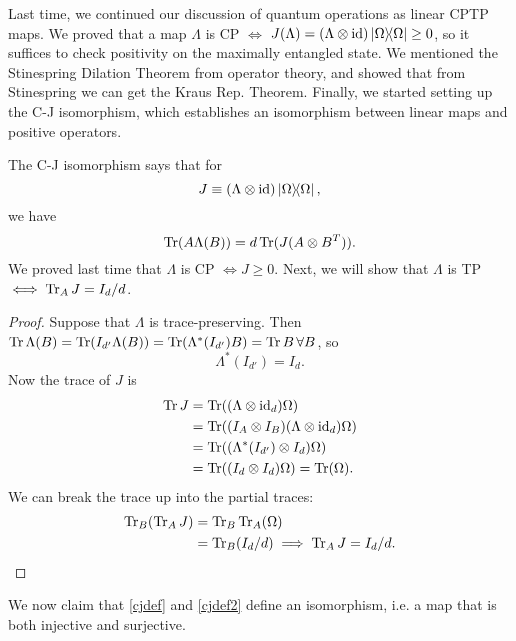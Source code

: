 Last time, we continued our discussion of quantum operations as linear CPTP maps. We proved that a map $\Lambda$ is CP $\iff$ $J(\Lambda)=(\Lambda \otimes \operatorname{id})\left\lvert \Omega \middle\rangle\!\middle\langle \Omega \right\rvert\geq 0$, so it suffices to check positivity on the maximally entangled state. We mentioned the Stinespring Dilation Theorem from operator theory, and showed that from Stinespring we can get the Kraus Rep. Theorem. Finally, we started setting up the C-J isomorphism, which establishes an isomorphism between linear maps and positive operators.

The C-J isomorphism says that for
\begin{equation}\label{cjdef}
    J\equiv (\Lambda \otimes \operatorname{id})\left\lvert \Omega \middle\rangle\!\middle\langle \Omega \right\rvert,
\end{equation}
we have
\begin{equation}\label{cjdef2}
    \operatorname{Tr}(A\Lambda(B))=d\operatorname{Tr}(J(A\otimes B^T)).
\end{equation}
We proved last time that $\Lambda$ is CP $\iff J\geq 0$. Next, we will show that $\Lambda$ is TP $\iff \operatorname{Tr}_A J =I_d/d$.
\begin{proof}
    Suppose that $\Lambda$ is trace-preserving. Then $\operatorname{Tr} \Lambda(B)=\operatorname{Tr}(I_{d'}\Lambda(B))=\operatorname{Tr}(\Lambda^*(I_{d'})B)=\operatorname{Tr} B\,\forall B$,
    so
    \begin{equation}
        \Lambda^*(I_{d'})=I_d.
    \end{equation}
    Now the trace of $J$ is
    \begin{align*}
        \operatorname{Tr} J &= \operatorname{Tr}((\Lambda \otimes \operatorname{id}_d)\Omega)\\
            &=\operatorname{Tr}((I_A\otimes I_B)(\Lambda \otimes \operatorname{id}_d)\Omega)\\
            &=\operatorname{Tr}((\Lambda^* (I_{d'}) \otimes I_d)\Omega)\\
            &=\operatorname{Tr}((I_d \otimes I_d)\Omega) =\operatorname{Tr}(\Omega).
    \end{align*}
    We can break the trace up into the partial traces:
    \begin{align*}
        \operatorname{Tr}_B(\operatorname{Tr}_A J) &= \operatorname{Tr}_B \operatorname{Tr}_A(\Omega)\\
            &= \operatorname{Tr}_B(I_d/d) \implies \operatorname{Tr}_A J = I_d/d.\qedhere
    \end{align*}
\end{proof}
We now claim that \ref{cjdef} and \ref{cjdef2} define an isomorphism, i.e. a map that is both injective and surjective.

